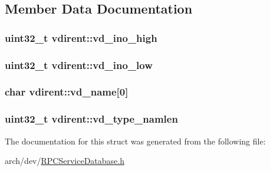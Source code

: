 \subsection{Member Data Documentation}
\hypertarget{structvdirent_aa8f0e831b95356f396fa8beebbe811dd}{
\subsubsection[{vd\+\_\+ino\+\_\+high}]{\setlength{\rightskip}{0pt plus 5cm}uint32\+\_\+t vdirent\+::vd\+\_\+ino\+\_\+high}}\label{structvdirent_aa8f0e831b95356f396fa8beebbe811dd}
\hypertarget{structvdirent_aa57729301d88e26ed65157133b57b882}{
\subsubsection[{vd\+\_\+ino\+\_\+low}]{\setlength{\rightskip}{0pt plus 5cm}uint32\+\_\+t vdirent\+::vd\+\_\+ino\+\_\+low}}\label{structvdirent_aa57729301d88e26ed65157133b57b882}
\hypertarget{structvdirent_ab175f044897eb0c2f66c359651ef11d6}{
\subsubsection[{vd\+\_\+name}]{\setlength{\rightskip}{0pt plus 5cm}char vdirent\+::vd\+\_\+name\mbox{[}0\mbox{]}}}\label{structvdirent_ab175f044897eb0c2f66c359651ef11d6}
\hypertarget{structvdirent_a2c96bd97a017e84589f4bdc7ea7df02f}{
\subsubsection[{vd\+\_\+type\+\_\+namlen}]{\setlength{\rightskip}{0pt plus 5cm}uint32\+\_\+t vdirent\+::vd\+\_\+type\+\_\+namlen}}\label{structvdirent_a2c96bd97a017e84589f4bdc7ea7df02f}


The documentation for this struct was generated from the following file\+:\begin{DoxyCompactItemize}
\item 
arch/dev/\hyperlink{_r_p_c_service_database_8h}{R\+P\+C\+Service\+Database.\+h}\end{DoxyCompactItemize}
